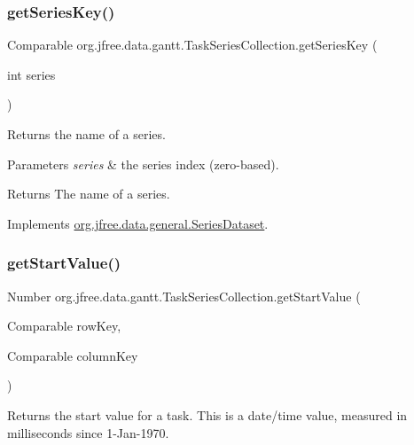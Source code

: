 \subsubsection{\texorpdfstring{get\+Series\+Key()}{getSeriesKey()}}
{\footnotesize\ttfamily Comparable org.\+jfree.\+data.\+gantt.\+Task\+Series\+Collection.\+get\+Series\+Key (\begin{DoxyParamCaption}\item[{int}]{series }\end{DoxyParamCaption})}

Returns the name of a series.


\begin{DoxyParams}{Parameters}
{\em series} & the series index (zero-\/based).\\
\hline
\end{DoxyParams}
\begin{DoxyReturn}{Returns}
The name of a series. 
\end{DoxyReturn}


Implements \mbox{\hyperlink{interfaceorg_1_1jfree_1_1data_1_1general_1_1_series_dataset_a60488892b2314a05a012999e26a74178}{org.\+jfree.\+data.\+general.\+Series\+Dataset}}.

\mbox{\label{classorg_1_1jfree_1_1data_1_1gantt_1_1_task_series_collection_a2751e6bff5ed9e14360182d2c6c5a4bf}} 
\subsubsection{\texorpdfstring{get\+Start\+Value()}{getStartValue()}\hspace{0.1cm}{\footnotesize\ttfamily [1/4]}}
{\footnotesize\ttfamily Number org.\+jfree.\+data.\+gantt.\+Task\+Series\+Collection.\+get\+Start\+Value (\begin{DoxyParamCaption}\item[{Comparable}]{row\+Key,  }\item[{Comparable}]{column\+Key }\end{DoxyParamCaption})}

Returns the start value for a task. This is a date/time value, measured in milliseconds since 1-\/\+Jan-\/1970.


